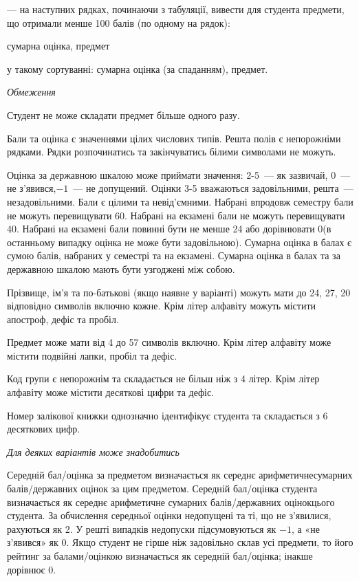 \documentclass[11pt, ukrainian]{article}
\begin{document}
{\noindent}--- на наступних рядках, починаючи з табуляції, вивести для студента предмети, що отримали менше 100 балів (по одному на рядок):\par
сумарна оцінка, предмет

{\noindent}у такому сортуванні: сумарна оцінка (за спаданням), предмет.


\bigskip\textit{Обмеження}

Студент не може складати предмет більше одного разу.

Бали та оцінка є значеннями цілих числових типів. Решта полів є непорожніми рядками.
Рядки розпочинатись та закінчуватись білими символами не можуть.

Оцінка за державною шкалою може приймати значення: 2-5~--- як зазвичай, 0~--- не з’явився,$-1$~--- не допущений. 
Оцінки 3-5 вважаються задовільними, решта~--- незадовільними. 
Бали є цілими та невід’ємними.
Набрані впродовж семестру бали не можуть перевищувати 60. 
Набрані на екзамені бали не можуть перевищувати 40. 
Набрані на екзамені бали повинні бути не менше 24 або дорівнювати 0(в останньому випадку оцінка не може бути задовільною). 
Сумарна оцінка в балах є сумою балів, набраних у семестрі та на екзамені.
Сумарна оцінка в балах та за державною шкалою мають бути узгоджені між собою.

Прізвище, ім’я та по-батькові (якщо наявне у варіанті) можуть мати до 24, 27, 20 відповідно символів включно кожне. 
Крім літер алфавіту можуть містити апостроф, дефіс та пробіл.

Предмет може мати від 4 до 57 символів включно. 
Крім літер алфавіту може містити подвійні лапки, пробіл та дефіс.

Код групи є непорожнім та складається не більш ніж з 4 літер. 
Крім літер алфавіту може містити десяткові цифри та дефіс.


Номер залікової книжки однозначно ідентифікує студента та складається з 6 десяткових цифр. 

\bigskip\textit{Для деяких варіантів може знадобитись}

Середній бал/оцінка за предметом визначається як середнє арифметичнесумарних балів/державних оцінок за цим предметом. 
Середній бал/оцінка студента визначається як середнє арифметичне сумарних балів/державних оцінокцього студента. 
За обчислення середньої оцінки недопущені та ті, що не з’явилися, рахуються як 2.
У решті випадків недопуски підсумовуються як $-1$, а «не з’явився» як 0.
Якщо студент не гірше ніж задовільно склав усі предмети, 
то його рейтинг за балами/оцінкою визначається як середній бал/оцінка; інакше дорівнює 0.
\end{document}
